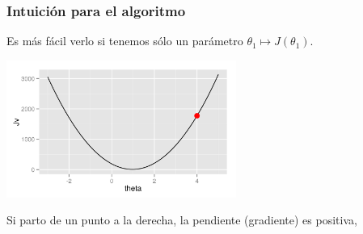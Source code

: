 \documentclass[aspectratio=169]{beamer}
\begin{document}
\begin{frame}
 \frametitle{Intuición para el algoritmo}
 \begin{overlayarea}{\textwidth}{8cm}
 Es más fácil verlo si tenemos sólo un parámetro $\theta_1\mapsto J(\theta_1)$.
\begin{center}
  \includegraphics[height=4.5cm]{gradientdescent-derecha-1.png}
\end{center}
Si parto de un punto a la derecha, la pendiente (gradiente) es positiva, \vphantom{por lo que el paso reduce el valor de $\theta_1$.}   
 \end{overlayarea}
\end{frame}
\end{document}
